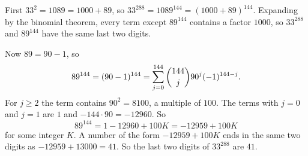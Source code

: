 First $33^2=1089=1000+89$, so $33^{288}=1089^{144}=(1000+89)^{144}$. Expanding by the binomial theorem, every term except $89^{144}$ contains a factor $1000$, so $33^{288}$ and $89^{144}$ have the same last two digits.

Now $89=90-1$, so
\[
89^{144}=(90-1)^{144}=\sum_{j=0}^{144}\dbinom{144}{j}90^j(-1)^{144-j}.
\]
For $j\ge2$ the term contains $90^2=8100$, a multiple of $100$. The terms with $j=0$ and $j=1$ are $1$ and $-144\cdot90=-12960$. So
\[
89^{144}=1-12960+100K=-12959+100K
\]
for some integer $K$. A number of the form $-12959+100K$ ends in the same two digits as $-12959+13000=41$. So the last two digits of $33^{288}$ are $\boxed{41}$.

